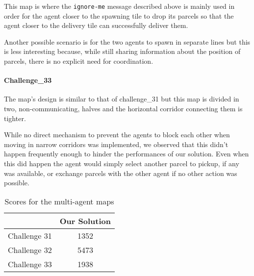 This map is where the \texttt{ignore-me} message described above is mainly used in order for the agent closer to the spawning tile to drop its parcels so that the agent closer to the delivery tile can successfully deliver them.

Another possible scenario is for the two agents to spawn in separate lines but this is less interesting because, while still sharing information about the position of parcels, there is no explicit need for coordination.
\paragraph{Challenge\_33} The map's design is similar to that of challenge\_31 but this map is divided in two, non-communicating, halves and the horizontal corridor connecting them is tighter.

While no direct mechanism to prevent the agents to block each other when moving in narrow corridors was implemented, we observed that this didn't happen frequently enough to hinder the performances of our solution. Even when this did happen the agent would simply select another parcel to pickup, if any was available, or exchange parcels with the other agent if no other action was possible.

\begin{table}
    \centering
    \begin{tabular}{c || c} \hline
                     & Our Solution \\ \hline
        Challenge 31 & 1352         \\
        Challenge 32 & 5473         \\
        Challenge 33 & 1938         \\  \hline
    \end{tabular}
    \caption{Scores for the multi-agent maps}
    \label{tab:multi_agent}
\end{table}

